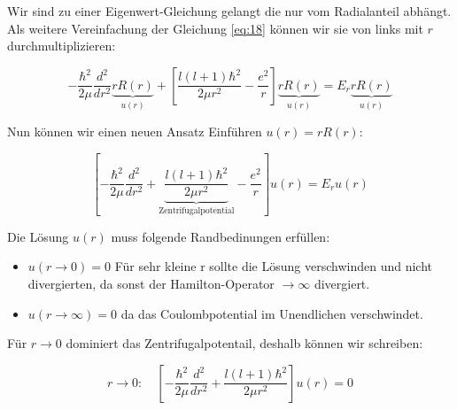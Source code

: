 Wir sind zu einer Eigenwert-Gleichung gelangt die nur vom Radialanteil abhängt. Als weitere Vereinfachung der Gleichung \eqref{eq:18} können wir sie von links mit \(r\) durchmultiplizieren:

\begin{equation}
  \label{eq:19}
   - \frac{\hbar^2}{2\mu}\frac{d^2}{dr^2}\underbrace{r R(r)}_{u(r)} + \left[\frac{l(l+1)\hbar^2}{2\mu r^2}  - \frac{e^2}{r}\right] \underbrace{r R(r)}_{u(r)}   = E_r \underbrace{r R(r)}_{u(r)}
\end{equation}

Nun können wir einen neuen Ansatz Einführen \(u(r) = rR(r)\):

\begin{equation}
  \label{eq:20}
    \left[-\frac{\hbar^2}{2\mu}\frac{d^2}{dr^2} + \underbrace{\frac{l(l+1)\hbar^2}{2\mu r^2}}_{\text{Zentrifugalpotential}}  - \frac{e^2}{r}\right] u(r)   = E_r u(r)
\end{equation}

Die Lösung \(u(r)\) muss folgende Randbedinungen erfüllen:

\begin{itemize}
\item \(u(r \to 0)=0  \) Für sehr kleine r sollte die Lösung verschwinden und nicht divergierten, da sonst der Hamilton-Operator \(\to\infty\) divergiert.
\item  \(u(r \to \infty)=0  \) da das Coulombpotential im Unendlichen verschwindet.
\end{itemize}

Für \(r\to 0\) dominiert das Zentrifugalpotentail, deshalb können wir schreiben:

\begin{equation}
  \label{eq:21}
  r\to 0: \quad\left[-\frac{\hbar^2}{2\mu}\frac{d^2}{dr^2}+ \frac{l(l+1)\hbar^2}{2\mu r^2}\right] u(r) = 0
\end{equation}


